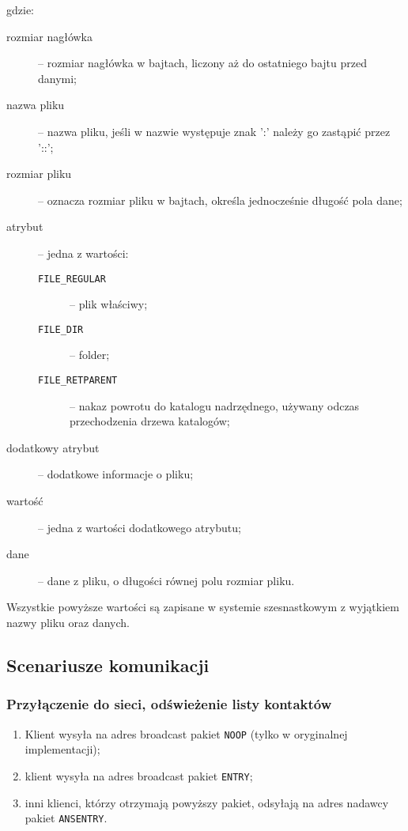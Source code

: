 \documentclass[11pt,leqno]{article}
\begin{document}
gdzie:
\begin{description}
	\item[rozmiar nagłówka] -- rozmiar nagłówka w bajtach, liczony aż do ostatniego bajtu przed danymi;
	\item[nazwa pliku] -- nazwa pliku, jeśli w nazwie występuje znak ':' należy go zastąpić przez '::';
	\item[rozmiar pliku] -- oznacza rozmiar pliku w bajtach, określa jednocześnie długość pola dane;
	\item[atrybut] -- jedna z wartości:
	\begin{description}
		\item[\textnormal{\texttt{FILE\_REGULAR}}] -- plik właściwy;
		\item[\textnormal{\texttt{FILE\_DIR}}] -- folder;
		\item[\textnormal{\texttt{FILE\_RETPARENT}}] -- nakaz powrotu do katalogu nadrzędnego,
		używany odczas przechodzenia drzewa katalogów;
	\end{description}
	\item[dodatkowy atrybut] -- dodatkowe informacje o pliku;
	\item[wartość] -- jedna z wartości dodatkowego atrybutu;
	\item[dane] -- dane z pliku, o długości równej polu rozmiar pliku.
\end{description}
Wszystkie powyższe wartości są zapisane w systemie szesnastkowym z wyjątkiem nazwy pliku oraz danych.

\subsection{Scenariusze komunikacji}

\subsubsection{Przyłączenie do sieci, odświeżenie listy kontaktów}

\begin{enumerate}
	\item Klient wysyła na adres broadcast pakiet \texttt{NOOP} (tylko w oryginalnej
	implementacji);
	\item klient wysyła na adres broadcast pakiet \texttt{ENTRY};
	\item inni klienci, którzy otrzymają powyższy pakiet, odsyłają na adres nadawcy
	pakiet \texttt{ANSENTRY}.
\end{enumerate}
\end{document}
